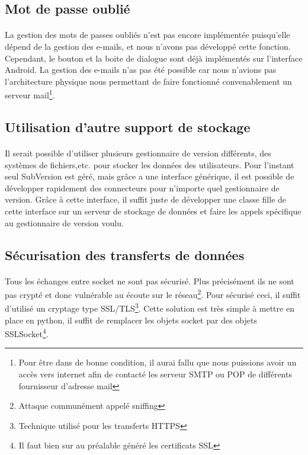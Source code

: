 \documentclass[a4paper,12pt]{article}
\begin{document}
\subsection{Mot de passe oublié}
\paragraph*{}
La gestion des mots de passes oubliés n'est pas encore implémentée puisqu'elle dépend de la gestion des e-mails, et nous n'avons pas développé cette fonction. Cependant, le bouton et la boite de dialogue sont déjà implémentés sur l'interface Android. La gestion des e-mails n'as pas été possible car nous n'avions pas l'architecture physique nous permettant de faire fonctionné convenablement un serveur mail\footnote{Pour être dans de bonne condition, il aurai fallu que nous puissions avoir un accès vers internet afin de contacté les serveur SMTP ou POP de différents fournisseur d'adresse mail}.

\subsection{Utilisation d'autre support de stockage}
\paragraph*{}
Il serait possible d'utiliser plusieurs gestionnaire de version différents, des systèmes de fichiers,etc. pour stocker les données des utilisateurs. Pour l'instant seul SubVersion est géré, mais grâce a une interface générique, il est possible de développer rapidement des connecteurs pour n'importe quel gestionnaire de version. Grâce à cette interface, il suffit juste de développer une classe fille de cette interface sur un serveur de stockage de données et faire les appels spécifique au gestionnaire de version voulu.

\subsection{Sécurisation des transferts de données}
\paragraph*{}
Tous les échanges entre socket ne sont pas sécurisé. Plus précisément ils ne sont pas crypté et donc vulnérable au écoute sur le réseau\footnote{Attaque communément appelé sniffing}. Pour sécurisé ceci, il suffit d'utilisé un cryptage type SSL/TLS\footnote{Technique utilisé pour les transferts HTTPS}. Cette solution est très simple à mettre en place en python, il suffit de remplacer les objets socket par des objets SSLSocket\footnote{Il faut bien sur au préalable généré les certificats SSL}.
\end{document}
